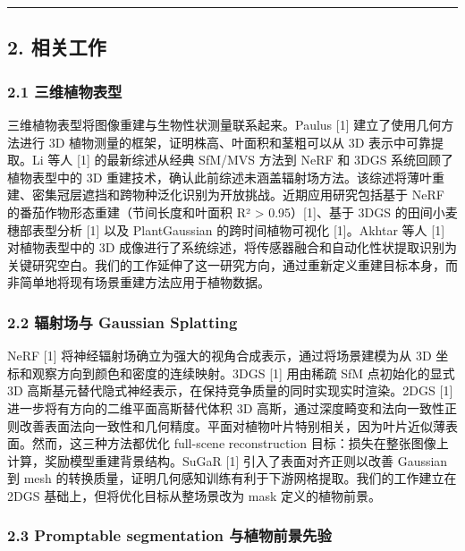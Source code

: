 \documentclass[11pt,a4paper]{article}
\begin{document}
\begin{center}\rule{0.5\linewidth}{0.5pt}\end{center}

\subsection{2. 相关工作}\label{ux76f8ux5173ux5de5ux4f5c}

\subsubsection{2.1
三维植物表型}\label{ux4e09ux7ef4ux690dux7269ux8868ux578b}

三维植物表型将图像重建与生物性状测量联系起来。Paulus {[}1{]}
建立了使用几何方法进行 3D 植物测量的框架，证明株高、叶面积和茎粗可以从
3D 表示中可靠提取。Li 等人 {[}1{]} 的最新综述从经典 SfM/MVS 方法到 NeRF
和 3DGS 系统回顾了植物表型中的 3D
重建技术，确认此前综述未涵盖辐射场方法。该综述将薄叶重建、密集冠层遮挡和跨物种泛化识别为开放挑战。近期应用研究包括基于
NeRF 的番茄作物形态重建（节间长度和叶面积 R² \textgreater{}
0.95）{[}1{]}、基于 3DGS 的田间小麦穗部表型分析 {[}1{]} 以及
PlantGaussian 的跨时间植物可视化 {[}1{]}。Akhtar 等人 {[}1{]}
对植物表型中的 3D
成像进行了系统综述，将传感器融合和自动化性状提取识别为关键研究空白。我们的工作延伸了这一研究方向，通过重新定义重建目标本身，而非简单地将现有场景重建方法应用于植物数据。

\subsubsection{2.2 辐射场与 Gaussian
Splatting}\label{ux8f90ux5c04ux573aux4e0e-gaussian-splatting}

NeRF {[}1{]} 将神经辐射场确立为强大的视角合成表示，通过将场景建模为从 3D
坐标和观察方向到颜色和密度的连续映射。3DGS {[}1{]} 用由稀疏 SfM
点初始化的显式 3D
高斯基元替代隐式神经表示，在保持竞争质量的同时实现实时渲染。2DGS {[}1{]}
进一步将有方向的二维平面高斯替代体积 3D
高斯，通过深度畸变和法向一致性正则改善表面法向一致性和几何精度。平面对植物叶片特别相关，因为叶片近似薄表面。然而，这三种方法都优化
full-scene reconstruction
目标：损失在整张图像上计算，奖励模型重建背景结构。SuGaR {[}1{]}
引入了表面对齐正则以改善 Gaussian 到 mesh
的转换质量，证明几何感知训练有利于下游网格提取。我们的工作建立在 2DGS
基础上，但将优化目标从整场景改为 mask 定义的植物前景。

\subsubsection{2.3 Promptable segmentation
与植物前景先验}\label{promptable-segmentation-ux4e0eux690dux7269ux524dux666fux5148ux9a8c}
\end{document}
